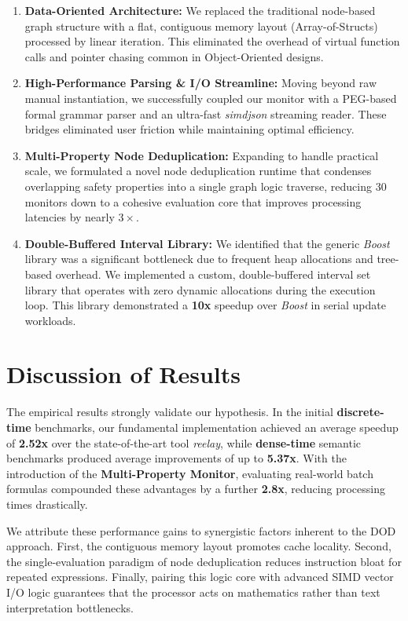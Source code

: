 \documentclass[a4paper,12pt]{report}
\begin{document}
\begin{enumerate} 
\item \textbf{Data-Oriented Architecture:} We replaced the traditional node-based graph structure with a flat, contiguous memory layout (Array-of-Structs) processed by linear iteration. This eliminated the overhead of virtual function calls and pointer chasing common in Object-Oriented designs. 
\item \textbf{High-Performance Parsing \& I/O Streamline:} Moving beyond raw manual instantiation, we successfully coupled our monitor with a PEG-based formal grammar parser and an ultra-fast \textit{simdjson} streaming reader. These bridges eliminated user friction while maintaining optimal efficiency.
\item \textbf{Multi-Property Node Deduplication:} Expanding to handle practical scale, we formulated a novel node deduplication runtime that condenses overlapping safety properties into a single graph logic traverse, reducing $30$ monitors down to a cohesive evaluation core that improves processing latencies by nearly $3\times$.
\item \textbf{Double-Buffered Interval Library:} We identified that the generic \textit{Boost} library was a significant bottleneck due to frequent heap allocations and tree-based overhead. We implemented a custom, double-buffered interval set library that operates with zero dynamic allocations during the execution loop. This library demonstrated a \textbf{10x} speedup over \textit{Boost} in serial update workloads. 
\end{enumerate}

\section{Discussion of Results}

The empirical results strongly validate our hypothesis. In the initial \textbf{discrete-time} benchmarks, our fundamental implementation achieved an average speedup of \textbf{2.52x} over the state-of-the-art tool \textit{reelay}, while \textbf{dense-time} semantic benchmarks produced average improvements of up to \textbf{5.37x}. With the introduction of the \textbf{Multi-Property Monitor}, evaluating real-world batch formulas compounded these advantages by a further \textbf{2.8x}, reducing processing times drastically.

We attribute these performance gains to synergistic factors inherent to the DOD approach. First, the contiguous memory layout promotes cache locality. Second, the single-evaluation paradigm of node deduplication reduces instruction bloat for repeated expressions. Finally, pairing this logic core with advanced SIMD vector I/O logic guarantees that the processor acts on mathematics rather than text interpretation bottlenecks.
\end{document}
